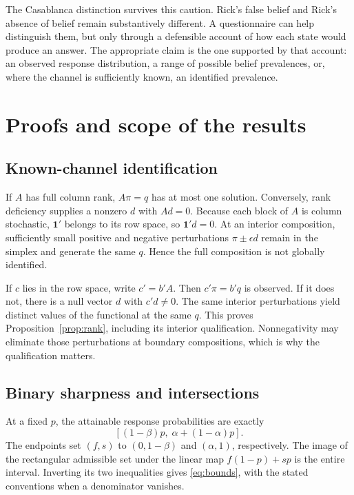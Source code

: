\documentclass[11pt]{article}
\begin{document}
The Casablanca distinction survives this caution. Rick's false belief and Rick's absence of belief remain substantively different. A questionnaire can help distinguish them, but only through a defensible account of how each state would produce an answer. The appropriate claim is the one supported by that account: an observed response distribution, a range of possible belief prevalences, or, where the channel is sufficiently known, an identified prevalence.

\clearpage



\clearpage
\appendix
\section{Proofs and scope of the results}
\label{app:proofs}

\subsection{Known-channel identification}

If $A$ has full column rank, $A\pi=q$ has at most one solution. Conversely, rank deficiency supplies a nonzero $d$ with $Ad=0$. Because each block of $A$ is column stochastic, $\mathbf1'$ belongs to its row space, so $\mathbf1'd=0$. At an interior composition, sufficiently small positive and negative perturbations $\pi\pm\epsilon d$ remain in the simplex and generate the same $q$. Hence the full composition is not globally identified.

If $c$ lies in the row space, write $c'=b'A$. Then $c'\pi=b'q$ is observed. If it does not, there is a null vector $d$ with $c'd\ne0$. The same interior perturbations yield distinct values of the functional at the same $q$. This proves Proposition~\ref{prop:rank}, including its interior qualification. Nonnegativity may eliminate those perturbations at boundary compositions, which is why the qualification matters.

\subsection{Binary sharpness and intersections}

At a fixed $p$, the attainable response probabilities are exactly
\[
 [(1-\beta)p,\;\alpha+(1-\alpha)p].
\]
The endpoints set $(f,s)$ to $(0,1-\beta)$ and $(\alpha,1)$, respectively. The image of the rectangular admissible set under the linear map $f(1-p)+sp$ is the entire interval. Inverting its two inequalities gives \eqref{eq:bounds}, with the stated conventions when a denominator vanishes.
\end{document}

